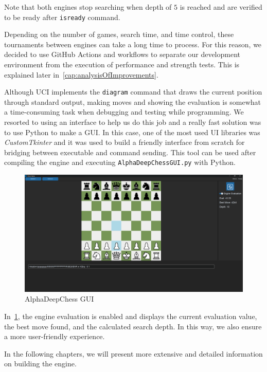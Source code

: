 \vspace{1em}

\noindent Note that both engines stop searching when depth of $5$ is reached and are verified to be ready after \texttt{isready} command.

\vspace{1em}

\noindent Depending on the number of games, search time, and time control, these tournaments between engines can take a long time to process. For this reason, we decided to use GitHub Actions and workflows to separate our development environment from the execution of performance and strength tests. This is explained later in~\cref{cap:analysisOfImprovements}.

\vspace{1em}

\noindent Although UCI implements the \texttt{diagram} command that draws the current position through standard output, making moves and showing the evaluation is somewhat a time-consuming task when debugging and testing while programming. We resorted to using an interface to help us do this job and a really fast solution was to use Python to make a GUI. In this case, one of the most used UI libraries was \textit{CustomTkinter} and it was used to build a friendly interface from scratch for bridging between executable and command sending. This tool can be used after compiling the engine and executing \texttt{AlphaDeepChessGUI.py} with Python.

\begin{figure}
    \centering
    \includegraphics[width=1.0\textwidth]{Imagenes/gui.png}
    \caption{AlphaDeepChess GUI}\label{fig:gui}
\end{figure}

\noindent In~\cref{fig:gui}, the engine evaluation is enabled and displays the current evaluation value, the best move found, and the calculated search depth. In this way, we also ensure a more user-friendly experience.

\vspace{1em}

\noindent In the following chapters, we will present more extensive and detailed information on building the engine.
